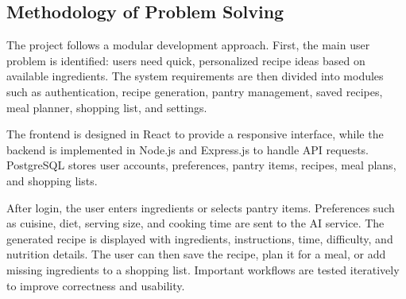 \subsection{Methodology of Problem Solving}
The project follows a modular development approach. First, the main user problem is identified: users need quick, personalized recipe ideas based on available ingredients. The system requirements are then divided into modules such as authentication, recipe generation, pantry management, saved recipes, meal planner, shopping list, and settings.

The frontend is designed in React to provide a responsive interface, while the backend is implemented in Node.js and Express.js to handle API requests. PostgreSQL stores user accounts, preferences, pantry items, recipes, meal plans, and shopping lists.

After login, the user enters ingredients or selects pantry items. Preferences such as cuisine, diet, serving size, and cooking time are sent to the AI service. The generated recipe is displayed with ingredients, instructions, time, difficulty, and nutrition details. The user can then save the recipe, plan it for a meal, or add missing ingredients to a shopping list. Important workflows are tested iteratively to improve correctness and usability.
